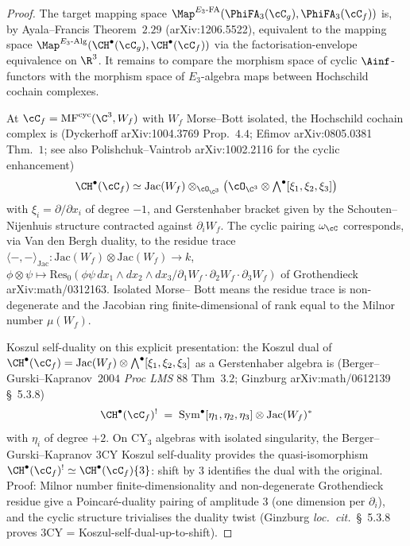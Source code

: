 \begin{proof}
The target mapping space $\Map^{E_3\text{-FA}}(\PhiFA_3(\cC_g),
\PhiFA_3(\cC_f))$ is, by Ayala--Francis
Theorem~$2.29$ (arXiv:1206.5522), equivalent to the mapping space
$\Map^{E_3\text{-Alg}}(\CH^\bullet(\cC_g), \CH^\bullet(\cC_f))$ via the
factorisation-envelope equivalence on $\R^3$.  It remains to compare
the morphism space of cyclic $\Ainf$-functors with the morphism space
of $E_3$-algebra maps between Hochschild cochain complexes.

At $\cC_f = \mathrm{MF}^{\mathrm{cyc}}(\C^3, W_f)$ with $W_f$
Morse--Bott isolated, the Hochschild cochain complex is (Dyckerhoff
arXiv:1004.3769 Prop.~$4.4$; Efimov arXiv:0805.0381 Thm.~$1$; see also
Polishchuk--Vaintrob arXiv:1002.2116 for the cyclic enhancement)
\[
  \CH^\bullet(\cC_f)
  \simeq
  \mathrm{Jac}(W_f)
  \otimes_{\cO_{\C^3}}
  \bigl(\cO_{\C^3} \otimes \textstyle\bigwedge^\bullet[\xi_1, \xi_2, \xi_3]\bigr)
\]
with $\xi_i = \partial/\partial x_i$ of degree $-1$, and Gerstenhaber
bracket given by the Schouten--Nijenhuis structure contracted against
$\partial_i W_f$.  The cyclic pairing $\omega_\cC$ corresponds, via
Van den Bergh duality, to the residue trace
$\langle -, - \rangle_{\mathrm{Jac}} \colon
\mathrm{Jac}(W_f) \otimes \mathrm{Jac}(W_f)
\to k$, $\phi \otimes \psi \mapsto \mathrm{Res}_0(\phi \psi\,
dx_1 \wedge dx_2 \wedge dx_3 / \partial_1 W_f \cdot \partial_2 W_f \cdot
\partial_3 W_f)$ of Grothendieck arXiv:math/0312163.  Isolated Morse--
Bott means the residue trace is non-degenerate and the Jacobian ring
finite-dimensional of rank equal to the Milnor number $\mu(W_f)$.

Koszul self-duality on this explicit presentation: the
Koszul dual of $\CH^\bullet(\cC_f) = \mathrm{Jac}(W_f) \otimes
\bigwedge^\bullet[\xi_1,\xi_2,\xi_3]$ as a Gerstenhaber algebra is
(Berger--Gurski--Kapranov~$2004$ \emph{Proc LMS} 88 Thm~$3.2$;
Ginzburg arXiv:math/0612139 \S~5.3.8)
\[
  \CH^\bullet(\cC_f)^! \;=\; \mathrm{Sym}^\bullet[\eta_1, \eta_2, \eta_3]
  \otimes \mathrm{Jac}(W_f)^*
\]
with $\eta_i$ of degree $+2$.  On CY$_3$ algebras with isolated
singularity, the Berger--Gurski--Kapranov $3$CY Koszul self-duality
provides the quasi-isomorphism $\CH^\bullet(\cC_f)^! \simeq
\CH^\bullet(\cC_f)\{3\}$: shift by $3$ identifies the dual with the
original.  Proof: Milnor number finite-dimensionality and non-degenerate
Grothendieck residue give a Poincar\'e-duality pairing of amplitude $3$
(one dimension per $\partial_i$), and the cyclic structure trivialises
the duality twist (Ginzburg \emph{loc.~cit.}~\S~5.3.8 proves $3$CY =
Koszul-self-dual-up-to-shift).


\end{proof}
